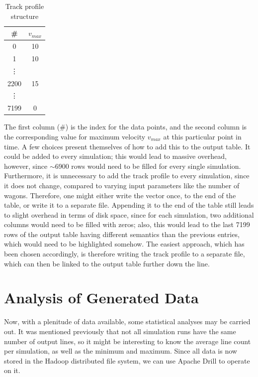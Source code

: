 \bigskip
\begin{table}[htb!]
	\centering
	\begin{tabular}{*{2}{c}}\toprule
		\# & $v_{max}$ \\ \midrule
		0 & 10 \\
		1 & 10 \\
		\vdots & \\
		2200 & 15 \\
		\vdots & \\
		7199 & 0 \\ 
	\end{tabular}
	\caption{Track profile structure}
	\label{tab:trackprofile}
\end{table}

\noindent
The first column (\#) is the index for the data points, and the second column is the corresponding value for maximum velocity $v_{max}$ at this particular point in time. A few choices present themselves of how to add this to the output table. It could be added to every simulation; this would lead to massive overhead, however, since $\sim$6900 rows would need to be filled for every single simulation. Furthermore, it is unnecessary to add the track profile to every simulation, since it does not change, compared to varying input parameters like the number of wagons. Therefore, one might either write the vector once, to the end of the table, or write it to a separate file. Appending it to the end of the table still leads to slight overhead in terms of disk space, since for each simulation, two additional columns would need to be filled with zeros; also, this would lead to the last 7199 rows of the output table having different semantics than the previous entries, which would need to be highlighted somehow. The easiest approach, which has been chosen accordingly, is therefore writing the track profile to a separate file, which can then be linked to the output table further down the line.

\section{Analysis of Generated Data}
\label{sec:AnalysisOfGeneratedData}
\par\noindent
Now, with a plenitude of data available, some statistical analyses may be carried out. It was mentioned previously that not all simulation runs have the same number of output lines, so it might be interesting to know the average line count per simulation, as well as the minimum and maximum. Since all data is now stored in the Hadoop distributed file system, we can use Apache Drill to operate on it.

